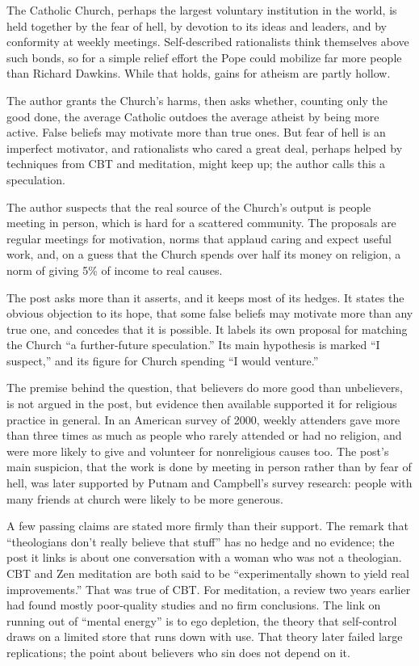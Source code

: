 \begin{afterword}
\summaryhead

The Catholic Church, perhaps the largest voluntary institution in the world, is held together by the fear of hell, by devotion to its ideas and leaders, and by conformity at weekly meetings. Self-described rationalists think themselves above such bonds, so for a simple relief effort the Pope could mobilize far more people than Richard Dawkins. While that holds, gains for atheism are partly hollow.

The author grants the Church's harms, then asks whether, counting only the good done, the average Catholic outdoes the average atheist by being more active. False beliefs may motivate more than true ones. But fear of hell is an imperfect motivator, and rationalists who cared a great deal, perhaps helped by techniques from CBT and meditation, might keep up; the author calls this a speculation.

The author suspects that the real source of the Church's output is people meeting in person, which is hard for a scattered community. The proposals are regular meetings for motivation, norms that applaud caring and expect useful work, and, on a guess that the Church spends over half its money on religion, a norm of giving 5\% of income to real causes.

\responsehead

The post asks more than it asserts, and it keeps most of its hedges. It states the obvious objection to its hope, that some false beliefs may motivate more than any true one, and concedes that it is possible. It labels its own proposal for matching the Church ``a further-future speculation.'' Its main hypothesis is marked ``I suspect,'' and its figure for Church spending ``I would venture.''

The premise behind the question, that believers do more good than unbelievers, is not argued in the post, but evidence then available supported it for religious practice in general. In an American survey of 2000, weekly attenders gave more than three times as much as people who rarely attended or had no religion, and were more likely to give and volunteer for nonreligious causes too. The post's main suspicion, that the work is done by meeting in person rather than by fear of hell, was later supported by Putnam and Campbell's survey research: people with many friends at church were likely to be more generous.

A few passing claims are stated more firmly than their support. The remark that ``theologians don't really believe that stuff'' has no hedge and no evidence; the post it links is about one conversation with a woman who was not a theologian. CBT and Zen meditation are both said to be ``experimentally shown to yield real improvements.'' That was true of CBT. For meditation, a review two years earlier had found mostly poor-quality studies and no firm conclusions. The link on running out of ``mental energy'' is to ego depletion, the theory that self-control draws on a limited store that runs down with use. That theory later failed large replications; the point about believers who sin does not depend on it.


\end{afterword}
